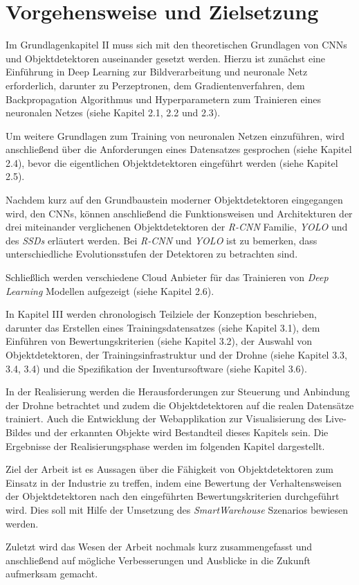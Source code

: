 \section{Vorgehensweise und Zielsetzung}

Im Grundlagenkapitel II muss sich mit den theoretischen Grundlagen von CNNs und Objektdetektoren auseinander gesetzt werden. Hierzu ist zunächst eine Einführung in Deep Learning zur Bildverarbeitung und neuronale Netz erforderlich, darunter zu Perzeptronen, dem Gradientenverfahren, dem Backpropagation Algorithmus und Hyperparametern zum Trainieren eines neuronalen Netzes (siehe Kapitel 2.1, 2.2 und 2.3). 

Um weitere Grundlagen zum Training von neuronalen Netzen einzuführen, wird anschließend über die Anforderungen eines Datensatzes gesprochen (siehe Kapitel 2.4), bevor die eigentlichen Objektdetektoren eingeführt werden (siehe Kapitel 2.5). 

Nachdem kurz auf den Grundbaustein moderner Objektdetektoren eingegangen wird, den CNNs, können anschließend die Funktionsweisen und Architekturen der drei miteinander verglichenen Objektdetektoren der \textit{R-CNN} Familie, \textit{YOLO} und des \textit{SSDs} erläutert werden. Bei \textit{R-CNN} und \textit{YOLO} ist zu bemerken, dass unterschiedliche Evolutionsstufen der Detektoren zu betrachten sind.

Schließlich werden verschiedene Cloud Anbieter für das Trainieren von \textit{Deep Learning} Modellen aufgezeigt (siehe Kapitel 2.6).

In Kapitel III werden chronologisch Teilziele der Konzeption beschrieben, darunter das Erstellen eines Trainingsdatensatzes (siehe Kapitel 3.1), dem Einführen von Bewertungskriterien (siehe Kapitel 3.2), der Auswahl von Objektdetektoren, der Trainingsinfrastruktur und der Drohne (siehe Kapitel 3.3, 3.4, 3.4) und die Spezifikation der Inventursoftware (siehe Kapitel 3.6).

In der Realisierung werden die Herausforderungen zur Steuerung und Anbindung der Drohne betrachtet und zudem die Objektdetektoren auf die realen Datensätze trainiert. Auch die Entwicklung der Webapplikation zur Visualisierung des Live-Bildes und der erkannten Objekte wird Bestandteil dieses Kapitels sein. Die Ergebnisse der Realisierungsphase werden im folgenden Kapitel dargestellt. 

Ziel der Arbeit ist es Aussagen über die Fähigkeit von Objektdetektoren zum Einsatz in der Industrie zu treffen, indem eine Bewertung der Verhaltensweisen der Objektdetektoren nach den eingeführten Bewertungskriterien durchgeführt wird. Dies soll mit Hilfe der Umsetzung des \textit{SmartWarehouse} Szenarios bewiesen werden.

Zuletzt wird das Wesen der Arbeit nochmals kurz zusammengefasst und anschließend auf mögliche Verbesserungen und Ausblicke in die Zukunft aufmerksam gemacht. 
